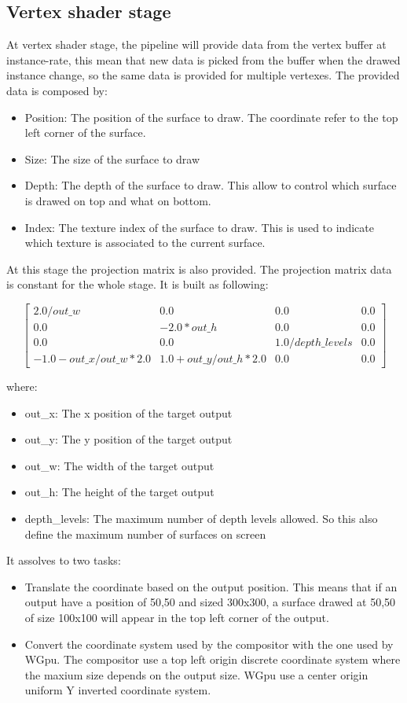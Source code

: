 \subsection{Vertex shader stage}
At vertex shader stage, the pipeline will provide data from the vertex buffer at instance-rate, this mean that new data is picked from the buffer when the drawed instance change, so the same data is provided for multiple vertexes. The provided data is composed by:
\begin{itemize}
	\item Position: The position of the surface to draw. The coordinate refer to the top left corner of the surface.
	\item Size: The size of the surface to draw
	\item Depth: The depth of the surface to draw. This allow to control which surface is drawed on top and what on bottom.
	\item Index: The texture index of the surface to draw. This is used to indicate which texture is associated to the current surface.
\end{itemize}
At this stage the projection matrix is also provided. The projection matrix data is constant for the whole stage. It is built as following:
\begin{center}
\[
	\begin{bmatrix}
		2.0 / out\_w & 0.0 & 0.0 & 0.0 \\
		0.0  & -2.0 * out\_h & 0.0 & 0.0 \\
		0.0  & 0.0 & 1.0 / depth\_levels & 0.0 \\
		-1.0 - out\_x/out\_w * 2.0 & 1.0+out\_y/out\_h*2.0 & 0.0 & 0.0
	\end{bmatrix}
	\]
\end{center}
where:
\begin{itemize}
	\item out\_x: The x position of the target output
	\item out\_y: The y position of the target output
	\item out\_w: The width of the target output
	\item out\_h: The height of the target output
	\item depth\_levels: The maximum number of depth levels allowed. So this also define the maximum number of surfaces on screen
\end{itemize}
It assolves to two tasks:
\begin{itemize}
	\item Translate the coordinate based on the output position. This means that if an output have a position of 50,50 and sized 300x300, a surface drawed at 50,50 of size 100x100 will appear in the top left corner of the output.
	\item Convert the coordinate system used by the compositor with the one used by WGpu. The compositor use a top left origin discrete coordinate system where the maxium size depends on the output size. WGpu use a center origin uniform Y inverted coordinate system.
\end{itemize}
